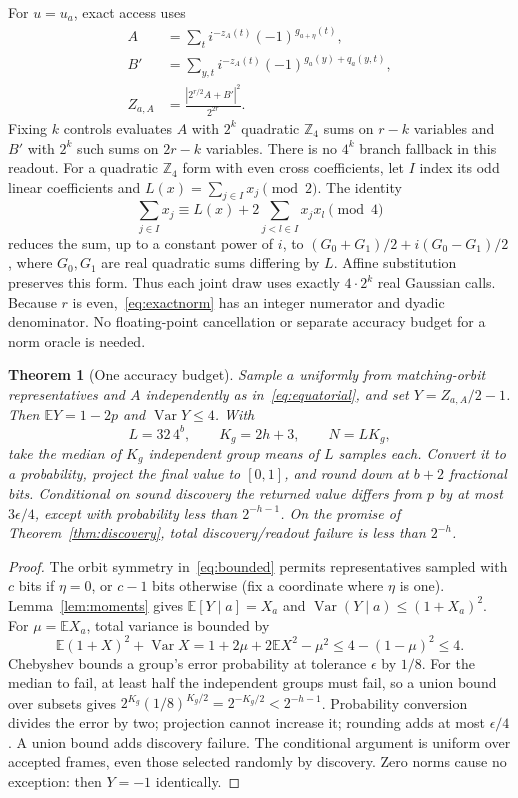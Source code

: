 \documentclass[11pt]{article}
\newtheorem{theorem}{Theorem}[section]
\newcommand{\E}{\mathbb E}
\newcommand{\Var}{\operatorname{Var}}
\begin{document}
For $u=u_a$, exact access uses
\begin{align}
 A&=\sum_t i^{-z_A(t)}(-1)^{g_{a+\eta}(t)},\nonumber\\
 B'&=\sum_{y,t}i^{-z_A(t)}(-1)^{g_a(y)+q_a(y,t)},\nonumber\\
 Z_{a,A}&=\frac{|2^{r/2}A+B'|^2}{2^{2r}}.\label{eq:exactnorm}
\end{align}
Fixing $k$ controls evaluates $A$ with $2^k$ quadratic $\mathbb Z_4$ sums on $r-k$
variables and $B'$ with $2^k$ such sums on $2r-k$ variables. There is no $4^k$ branch
fallback in this readout. For a quadratic $\mathbb Z_4$ form with even cross
coefficients, let $I$ index its odd linear coefficients and
$L(x)=\sum_{j\in I}x_j\pmod2$. The identity
\[
 \sum_{j\in I}x_j\equiv L(x)+2\sum_{j<l\in I}x_jx_l\pmod4
\]
reduces the sum, up to a constant power of $i$, to
$(G_0+G_1)/2+i(G_0-G_1)/2$, where $G_0,G_1$ are real quadratic sums differing by
$L$. Affine substitution preserves this form. Thus each joint draw uses exactly
$4\cdot2^k$ real Gaussian calls. Because $r$ is even,~\eqref{eq:exactnorm} has an
integer numerator and dyadic denominator. No floating-point cancellation or separate
accuracy budget for a norm oracle is needed.

\begin{theorem}[One accuracy budget]\label{thm:estimator}
Sample $a$ uniformly from matching-orbit representatives and $A$ independently as
in~\eqref{eq:equatorial}, and set $Y=Z_{a,A}/2-1$. Then $\E Y=1-2p$ and
$\Var Y\leq4$. With
\begin{equation}\label{eq:schedule}
 L=32\,4^b,\qquad K_g=2h+3,\qquad N=LK_g,
\end{equation}
take the median of $K_g$ independent group means of $L$ samples each. Convert it to
a probability, project the final value to $[0,1]$, and round down at $b+2$ fractional
bits. Conditional on sound discovery the returned value differs from $p$ by at most
$3\epsilon/4$, except with probability less than $2^{-h-1}$. On the promise of
Theorem~\ref{thm:discovery}, total discovery/readout failure is less than $2^{-h}$.
\end{theorem}
\begin{proof}
The orbit symmetry in~\eqref{eq:bounded} permits representatives sampled with $c$
bits if $\eta=0$, or $c-1$ bits otherwise (fix a coordinate where $\eta$ is one).
Lemma~\ref{lem:moments} gives
$\E[Y\mid a]=X_a$ and $\Var(Y\mid a)\leq(1+X_a)^2$.
For $\mu=\E X_a$, total variance is bounded by
\[
 \E(1+X)^2+\Var X
 =1+2\mu+2\E X^2-\mu^2\leq4-(1-\mu)^2\leq4.
\]
Chebyshev bounds a group's error probability at tolerance $\epsilon$ by $1/8$.
For the median to fail, at least half the independent groups must fail, so a union
bound over subsets gives $2^{K_g}(1/8)^{K_g/2}=2^{-K_g/2}<2^{-h-1}$.
Probability conversion divides the error by two; projection cannot increase it;
rounding adds at most $\epsilon/4$. A union bound adds discovery failure. The
conditional argument is uniform over accepted frames, even those selected randomly
by discovery. Zero norms cause no exception: then $Y=-1$ identically.
\end{proof}
\end{document}
